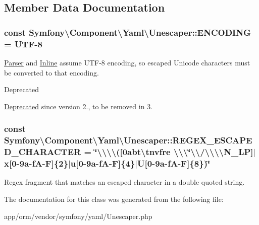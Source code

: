 \subsection{Member Data Documentation}
\subsubsection[{\texorpdfstring{E\+N\+C\+O\+D\+I\+NG}{ENCODING}}]{\setlength{\rightskip}{0pt plus 5cm}const Symfony\textbackslash{}\+Component\textbackslash{}\+Yaml\textbackslash{}\+Unescaper\+::\+E\+N\+C\+O\+D\+I\+NG = \textquotesingle{}U\+TF-\/8\textquotesingle{}}\hypertarget{classSymfony_1_1Component_1_1Yaml_1_1Unescaper_acf22c4bb358a547676976c505ac8a40d}{}\label{classSymfony_1_1Component_1_1Yaml_1_1Unescaper_acf22c4bb358a547676976c505ac8a40d}
\hyperlink{classSymfony_1_1Component_1_1Yaml_1_1Parser}{Parser} and \hyperlink{classSymfony_1_1Component_1_1Yaml_1_1Inline}{Inline} assume U\+T\+F-\/8 encoding, so escaped Unicode characters must be converted to that encoding.

\begin{DoxyRefDesc}{Deprecated}
\item[\hyperlink{deprecated__deprecated000001}{Deprecated}]since version 2., to be removed in 3.\end{DoxyRefDesc}
\subsubsection[{\texorpdfstring{R\+E\+G\+E\+X\+\_\+\+E\+S\+C\+A\+P\+E\+D\+\_\+\+C\+H\+A\+R\+A\+C\+T\+ER}{REGEX_ESCAPED_CHARACTER}}]{\setlength{\rightskip}{0pt plus 5cm}const Symfony\textbackslash{}\+Component\textbackslash{}\+Yaml\textbackslash{}\+Unescaper\+::\+R\+E\+G\+E\+X\+\_\+\+E\+S\+C\+A\+P\+E\+D\+\_\+\+C\+H\+A\+R\+A\+C\+T\+ER = \char`\"{}\textbackslash{}\textbackslash{}\textbackslash{}\textbackslash{}(\mbox{[}0abt\textbackslash{}tnvfre \textbackslash{}\textbackslash{}\textbackslash{}\char`\"{}\textbackslash{}\textbackslash{}/\textbackslash{}\textbackslash{}\textbackslash{}\textbackslash{}\+N\+\_\+\+L\+P\mbox{]}$\vert$x\mbox{[}0-\/9a-\/f\+A-\/\+F\mbox{]}\{2\}$\vert$u\mbox{[}0-\/9a-\/f\+A-\/\+F\mbox{]}\{4\}$\vert$\+U\mbox{[}0-\/9a-\/f\+A-\/\+F\mbox{]}\{8\})\char`\"{}}\hypertarget{classSymfony_1_1Component_1_1Yaml_1_1Unescaper_a7ac46527215d1d9abb99d5d046ada1ef}{}\label{classSymfony_1_1Component_1_1Yaml_1_1Unescaper_a7ac46527215d1d9abb99d5d046ada1ef}
Regex fragment that matches an escaped character in a double quoted string. 

The documentation for this class was generated from the following file\+:\begin{DoxyCompactItemize}
\item 
app/orm/vendor/symfony/yaml/Unescaper.\+php\end{DoxyCompactItemize}
